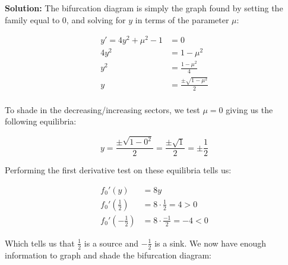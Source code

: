 \documentclass{article}
\begin{document}
\noindent\textbf{Solution:} The bifurcation diagram is simply the graph found by setting the family equal to 0, and solving for $y$ in terms of the parameter $\mu$:

\begin{align*}
    y'=4y^2+\mu^2-1&=0\\
    4y^2&=1-\mu^2\\
    y^2&=\frac{1-\mu^2}{4}\\
    y&=\frac{\pm\sqrt{1-\mu^2}}{2}\\
\end{align*}

To shade in the decreasing/increasing sectors, we test $\mu=0$ giving us the following equilibria:

\begin{equation*}
    y=\frac{\pm\sqrt{1-0^2}}{2}=\frac{\pm\sqrt{1}}{2}=\pm\frac{1}{2}
\end{equation*}

Performing the first derivative test on these equilibria tells us:

\begin{align*}
    f_0'(y)&=8y\\
    f_0'\left(\frac{1}{2}\right)&=8\cdot\frac{1}{2}=4>0\\
    f_0'\left(-\frac{1}{2}\right)&=8\cdot\frac{-1}{2}=-4<0
\end{align*}

Which tells us that $\frac{1}{2}$ is a source and $-\frac{1}{2}$ is a sink. We now have enough information to graph and shade the bifurcation diagram:
\end{document}

